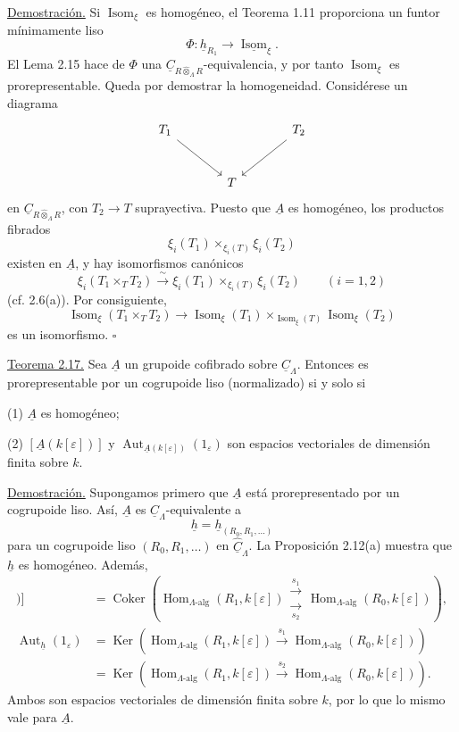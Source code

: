 \underline{Demostración.} Si $\operatorname{Isom}_\xi$ es homogéneo,
el Teorema 1.11 proporciona un funtor mínimamente liso
\[
 \Phi:\underline h_{R_1}\longrightarrow
 \underline{\operatorname{Isom}}_\xi.
\]
El Lema 2.15 hace de $\Phi$ una
$\underline C_{R\widehat\otimes_\Lambda R}$-equivalencia,
y por tanto $\operatorname{Isom}_\xi$ es prorepresentable. Queda por
demostrar la homogeneidad. Considérese un diagrama
\[
\begin{tikzcd}[column sep=large,row sep=large]
 T_1 \arrow[dr] && T_2 \arrow[dl]\\
 & T &
\end{tikzcd}
\]
en $\underline C_{R\widehat\otimes_\Lambda R}$, con
$T_2\longrightarrow T$ suprayectiva. Puesto que $\underline A$ es
homogéneo, los productos fibrados
\[
 \xi_i(T_1)\times_{\xi_i(T)}\xi_i(T_2)
\]
existen en $\underline A$, y hay isomorfismos canónicos
\[
 \xi_i(T_1\times_TT_2)\xrightarrow{\ \sim\ }
 \xi_i(T_1)\times_{\xi_i(T)}\xi_i(T_2)
 \qquad(i=1,2)
\]
(cf. 2.6(a)). Por consiguiente,
\[
 \operatorname{Isom}_\xi(T_1\times_TT_2)
 \longrightarrow
 \operatorname{Isom}_\xi(T_1)
 \times_{\operatorname{Isom}_\xi(T)}
 \operatorname{Isom}_\xi(T_2)
\]
es un isomorfismo. \hfill$\square$

\underline{Teorema 2.17.} Sea $\underline A$ un grupoide cofibrado
sobre $\underline C_\Lambda$. Entonces es prorepresentable por un
cogrupoide liso (normalizado) si y solo si


(1) $\underline A$ es homogéneo;

(2) $[\underline A(k[\varepsilon])]$ y
$\operatorname{Aut}_{\underline A(k[\varepsilon])}(1_\varepsilon)$
son espacios vectoriales de dimensión finita sobre $k$.

\underline{Demostración.} Supongamos primero que $\underline A$ está
prorepresentado por un cogrupoide liso. Así, $\underline A$ es
$\underline C_\Lambda$-equivalente a
\[
 \underline h=\underline h_{(R_0,R_1,\ldots)}
\]
para un cogrupoide liso $(R_0,R_1,\ldots)$ en
$\widehat{\underline C}_\Lambda$. La Proposición 2.12(a) muestra que
$\underline h$ es homogéneo. Además,
\begin{align*}
 [\underline h(k[\varepsilon])]
 &=\operatorname{Coker}\!\left(
   \operatorname{Hom}_{\Lambda\text{-alg}}(R_1,k[\varepsilon])
   \mathrel{\substack{\xrightarrow{\ s_1\ }\\[-.6ex]
                       \xrightarrow[\ s_2\ ]{}}}
   \operatorname{Hom}_{\Lambda\text{-alg}}(R_0,k[\varepsilon])
   \right),\\[1ex]
 \operatorname{Aut}_{\underline h}(1_\varepsilon)
 &=\operatorname{Ker}\!\left(
   \operatorname{Hom}_{\Lambda\text{-alg}}(R_1,k[\varepsilon])
   \xrightarrow{\ s_1\ }
   \operatorname{Hom}_{\Lambda\text{-alg}}(R_0,k[\varepsilon])
   \right)\\
 &=\operatorname{Ker}\!\left(
   \operatorname{Hom}_{\Lambda\text{-alg}}(R_1,k[\varepsilon])
   \xrightarrow{\ s_2\ }
   \operatorname{Hom}_{\Lambda\text{-alg}}(R_0,k[\varepsilon])
   \right).
\end{align*}
Ambos son espacios vectoriales de dimensión finita sobre $k$, por lo que
lo mismo vale para $\underline A$.


